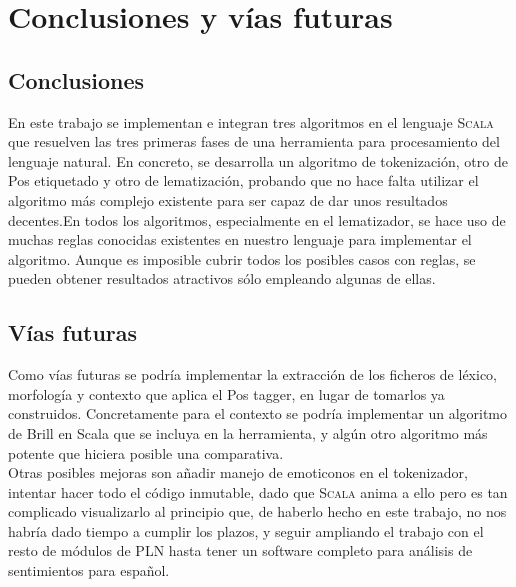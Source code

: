 \chapter{Conclusiones y vías futuras}
\label{conclusion}
\section{Conclusiones}
En este trabajo se implementan e integran tres algoritmos en el lenguaje \textsc{Scala} que resuelven las tres primeras fases de una herramienta para procesamiento del lenguaje natural. En concreto, se desarrolla un algoritmo de tokenización, otro de Pos etiquetado y otro de lematización, probando que no hace falta utilizar el algoritmo más complejo existente para ser capaz de dar unos resultados decentes.\newline En todos los algoritmos, especialmente en el lematizador, se hace uso de muchas reglas conocidas existentes en nuestro lenguaje para implementar el algoritmo. Aunque es imposible cubrir todos los posibles casos con reglas, se pueden obtener resultados atractivos sólo empleando algunas de ellas. 
\section{Vías futuras}
Como vías futuras se podría implementar la extracción de los ficheros de léxico, morfología y contexto que aplica el Pos tagger, en lugar de tomarlos ya construidos. Concretamente para el contexto se podría implementar un algoritmo de Brill en Scala que se incluya en la herramienta, y algún otro algoritmo más potente que hiciera posible una comparativa. 
\\[\baselineskip]
Otras posibles mejoras son añadir manejo de emoticonos en el tokenizador, intentar hacer todo el código inmutable, dado que \textsc{Scala} anima a ello pero es tan complicado visualizarlo al principio que, de haberlo hecho en este trabajo, no nos habría dado tiempo a cumplir los plazos, y seguir ampliando el trabajo con el resto de módulos de PLN hasta tener un software completo para análisis de sentimientos para español.
